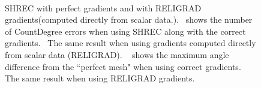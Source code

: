 \begin{figure}[p] 
	\centering
	\\
	\caption{SHREC with perfect gradients and with RELIGRAD gradients(computed directly from scalar data.).~\protect{} shows the number of CountDegree errors when using SHREC along with the correct gradients.~\protect{} The same result when using gradients computed directly from scalar data (RELIGRAD). ~\protect{} shows the maximum angle difference from the ``perfect mesh" when using correct gradients.~\protect{} The same result when using RELIGRAD gradients. }
	\label{fig:shrecTwoCube}
	\vskip-0.2cm
\end{figure}

